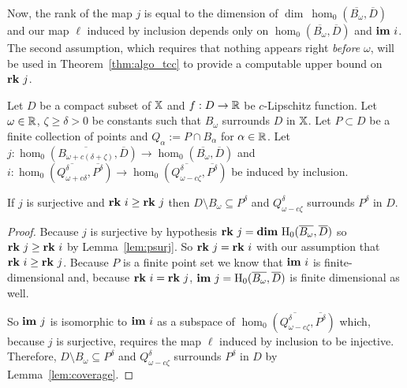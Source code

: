 Now, the rank of the map $j$ is equal to the dimension of $\dim~\hom_0(\overline{B_\omega}, \overline{D})$ and our map $\ell$ induced by inclusion depends only on $\hom_0(\overline{B_\omega}, \overline{D})$ and $\mathbf{im}~i$.
The second assumption, which requires that nothing appears right \emph{before} $\omega$, will be used in Theorem~\ref{thm:algo_tcc} to provide a computable upper bound on $\mathbf{rk}~j$.

\begin{theorem}\label{thm:geo_tcc}
  Let $D$ be a compact subset of $\mathbb{X}$ and $f : D\to\mathbb{R}$ be $c$-Lipschitz function.
  Let $\omega\in\mathbb{R}$, $\zeta\geq\delta > 0$ be constants such that $B_{\omega}$ surrounds $D$ in $\mathbb{X}$.
  Let $P\subset D$ be a finite collection of points and $Q_\alpha := P\cap B_\alpha$ for $\alpha\in\mathbb{R}$.
  Let $j : \hom_0(\overline{B_{\omega+c(\delta+\zeta)}},\overline{D})\to \hom_0(\overline{B_{\omega}},\overline{D})$ and $i : \hom_0(\overline{Q_{\omega+c\delta}^\delta}, \overline{P^\delta})\to \hom_0(\overline{Q_{\omega-c\zeta}^\delta}, \overline{P^\delta})$ be induced by inclusion.

  If $j$ is surjective and $\mathbf{rk}~i\geq \mathbf{rk}~j$ then $D\setminus B_{\omega}\subseteq P^\delta$ and $Q_{\omega-c\zeta}^\delta$ surrounds $P^\delta$ in $D$.
\end{theorem}
\begin{proof}
  Because $j$ is surjective by hypothesis $\mathbf{rk}~j = \mathbf{dim}~\mathrm{H}_0(\overline{B_{\omega}},\overline{D})$ so $\mathbf{rk}~j\geq \mathbf{rk}~i$ by Lemma~\ref{lem:psurj}.
  So $\mathbf{rk}~j = \mathbf{rk}~i$ with our assumption that $\mathbf{rk}~i\geq \mathbf{rk}~j$.
  Because $P$ is a finite point set we know that $\mathbf{im}~i$ is finite-dimensional and, because $\mathbf{rk}~i = \mathbf{rk}~j$, $\mathbf{im}~j=\mathrm{H}_0(\overline{B_{\omega}}, \overline{D})$ is finite dimensional as well.

  So $\mathbf{im}~j$ is isomorphic to $\mathbf{im}~i$ as a subspace of $\hom_0(\overline{Q_{\omega-c\zeta}^\delta}, \overline{P^\delta})$ which, because $j$ is surjective, requires the map $\ell$ induced by inclusion to be injective.
  Therefore, $D\setminus B_{\omega}\subseteq P^\delta$ and $Q_{\omega-c\zeta}^\delta$ surrounds $P^\delta$ in $D$ by Lemma~\ref{lem:coverage}. %
\end{proof}
